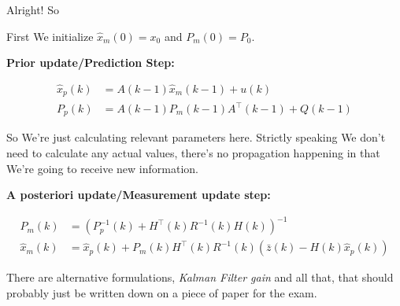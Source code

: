 \documentclass{article}
\begin{document}
		Alright! So
		
		First We initialize $\hat{x}_m(0) = x_0$ and $P_m(0) = P_0$.
		
		\textbf{Prior update/Prediction Step:}
		
		\begin{align}
			\hat{x}_p(k) &= A(k-1)\hat{x}_m(k-1) + u(k)\\
			P_p(k) &= A(k-1)P_m(k-1)A^\top(k-1) + Q(k-1)
		\end{align}
		
		So We're just calculating relevant parameters here. Strictly speaking We don't need to calculate any actual values, there's no propagation happening in that We're going to receive new information. 
		
		\textbf{A posteriori update/Measurement update step:}
		
		\begin{align}
			P_m(k) &= (P^{-1}_p(k) + H^\top(k)R^{-1}(k)H(k))^{-1}\\
			\hat{x}_m(k) &= \hat{x}_p(k) + P_m(k)H^\top(k)R^{-1}(k)(\bar{z}(k) - H(k)\hat{x}_p(k))
		\end{align}
		
		There are alternative formulations, \textit{Kalman Filter gain} and all that, that should probably just be written down on a piece of paper for the exam.
		
		
		
		
		
		
		
	
\end{document}
